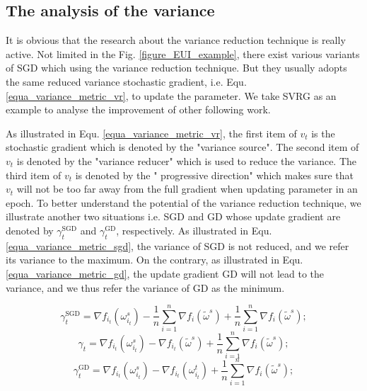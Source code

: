 \documentclass[letterpaper]{article}
\begin{document}
\subsection{The analysis of the variance}
\label{subsect_variance_analysis}
It is obvious that the research about the variance reduction technique is really active. Not limited in the Fig. \ref{figure_EUI_example},  there exist various variants of SGD which using the variance reduction technique. But they usually adopts the same reduced variance stochastic gradient, i.e. Equ. \ref{equa_variance_metric_vr}, to update the parameter. We take SVRG  as an example to analyse the improvement of other following work.

As illustrated in Equ. \ref{equa_variance_metric_vr}, the first item of $v_t$ is the stochastic gradient which is denoted by the "variance source". The second item of $v_t$ is denoted by the "variance reducer" which is used to reduce the variance. The third item of $v_t$ is denoted by the " progressive direction" which makes sure that $v_t$ will not be too far away from the full gradient when updating parameter in an epoch. To better understand the potential of the variance reduction technique, we illustrate another two situations i.e. SGD and GD whose update gradient are denoted by $\gamma_t^{\text{SGD}}$ and $\label{equa_variance_metric_gd}
\gamma_t^{\text{GD}}$, respectively.  As illustrated in Equ. \ref{equa_variance_metric_sgd}, the variance of SGD is not reduced, and we refer its variance to the maximum. On the contrary, as illustrated in Equ. \ref{equa_variance_metric_gd}, the update gradient GD will not lead to the variance, and we thus refer the variance of GD as the minimum. 

\begin{equation}
\label{equa_variance_metric_sgd}
 \gamma_t^{\text{SGD}}=\nabla f_{i_t}(\omega_{i_t}^s)-\frac{1}{n}\sum\limits_{i=1}^n\nabla f_i(\tilde{\omega}^s)+\frac{1}{n}\sum\limits_{i=1}^n\nabla f_i(\tilde{\omega}^s);
\end{equation}
\begin{equation}
\label{equa_variance_metric_vr}
\gamma_t=\nabla f_{i_t}(\omega_{i_t}^s)-\nabla f_{i_t}(\tilde{\omega}^s)+\frac{1}{n}\sum\limits_{i=1}^n\nabla f_i(\tilde{\omega}^s);
\end{equation}
\begin{equation}
\label{equa_variance_metric_gd}
\gamma_t^{\text{GD}}=\nabla f_{i_t}(\omega_{i_t}^s)-\nabla f_{i_t}(\omega_{i_t}^t)+\frac{1}{n}\sum\limits_{i=1}^n\nabla f_i(\tilde{\omega}^s);
\end{equation}
\end{document}
